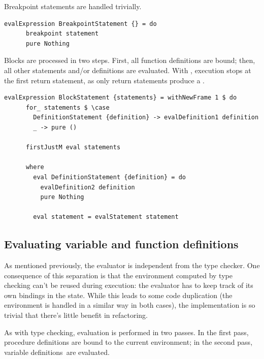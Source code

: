 \documentclass[UdineBachThesis,american,11pt]{PhdThesis}
\begin{document}
  Breakpoint statements are handled trivially.

  \begin{lstlisting}[gobble=4,basicstyle=\ttfamily\small]
    evalExpression BreakpointStatement {} = do
      breakpoint statement
      pure Nothing
  \end{lstlisting}

  Blocks are processed in two steps. First, all function definitions are bound;
  then, all other statements and/or definitions are evaluated. With
  \lstinline@firstJustM@, execution stops at the first return statement, as
  only return statements produce a \lstinline@Just@.

  \begin{lstlisting}[gobble=4,basicstyle=\ttfamily\small]
    evalExpression BlockStatement {statements} = withNewFrame 1 $ do
      for_ statements $ \case
        DefinitionStatement {definition} -> evalDefinition1 definition
        _ -> pure ()

      firstJustM eval statements

      where
        eval DefinitionStatement {definition} = do
          evalDefinition2 definition
          pure Nothing

        eval statement = evalStatement statement
  \end{lstlisting}

  \subsection{Evaluating variable and function definitions}

  As mentioned previously, the evaluator is independent from the type checker.
  One consequence of this separation is that the environment computed by type
  checking can't be reused during execution: the evaluator has to keep track of
  its own bindings in the state. While this leads to some code duplication (the
  environment is handled in a similar way in both cases), the implementation is
  so trivial that there's little benefit in refactoring.

  As with type checking, evaluation is performed in two passes. In the first
  pass, procedure definitions are bound to the current environment; in the
  second pass, variable definitions~are evaluated.
\end{document}
